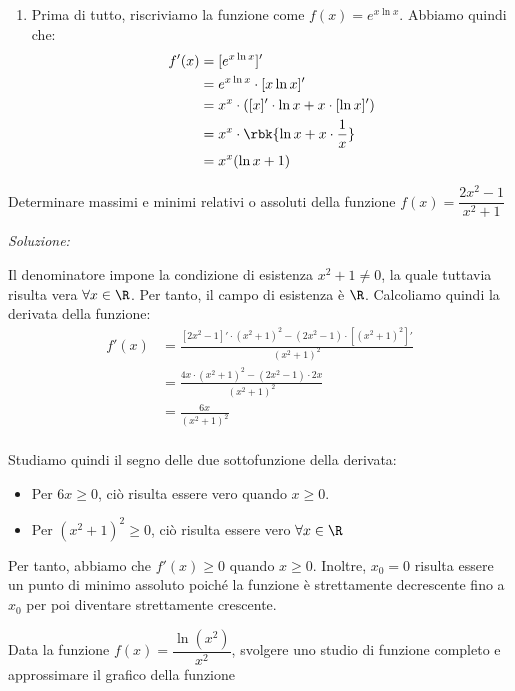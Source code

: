 \documentclass[a4paper, 12pt]{report}
\begin{document}
\begin{enumerate}
        \item Prima di tutto, riscriviamo la funzione come $f(x) = e^{x \ln x}$. Abbiamo quindi che:
        \[\begin{split}
            f'(x) &= [e^{x \ln x}]' \\
            &= e^{x \ln x} \cdot [x \ln x]'\\
            &= x^x \cdot ([x]' \cdot \ln x + x \cdot [\ln x]')\\
            &= x^x \cdot \rbk{\ln x + x \cdot \frac{1}{x}}\\
            &= x^x (\ln x + 1)\\
        \end{split}\]
    \end{enumerate}

    \begin{framedprob}{}
        Determinare massimi e minimi relativi o assoluti della funzione $f(x) = \dfrac{2x^2-1}{x^2+1}$
    \end{framedprob}

    \textit{Soluzione:}

    Il denominatore impone la condizione di esistenza $x^2 + 1 \neq 0$, la quale tuttavia risulta vera $\forall x \in \R$. Per tanto, il campo di esistenza è $\R$. Calcoliamo quindi la derivata della funzione:
    \[\begin{split}
        f'(x) &= \frac{[2x^2-1]' \cdot (x^2+1)^2-(2x^2-1) \cdot [(x^2+1)^2]'}{(x^2+1)^2} \\
        &= \frac{4x \cdot (x^2+1)^2-(2x^2-1) \cdot 2x}{(x^2+1)^2} \\
        &= \frac{6x}{(x^2+1)^2} \\
    \end{split}\]

    Studiamo quindi il segno delle due sottofunzione della derivata:
    \begin{itemize}
        \item Per $6x \geq 0$, ciò risulta essere vero quando $x \geq 0$.
        \item Per $(x^2+1)^2 \geq 0$, ciò risulta essere vero $\forall x \in \R$
    \end{itemize}

    Per tanto, abbiamo che $f'(x) \geq 0$ quando $x \geq 0$. Inoltre, $x_0 = 0$ risulta essere un punto di minimo assoluto poiché la funzione è strettamente decrescente fino a $x_0$ per poi diventare strettamente crescente.


    \begin{framedprob}{}
        Data la funzione $f(x) = \dfrac{\ln(x^2)}{x^2}$, svolgere uno studio di funzione completo e approssimare il grafico della funzione
    \end{framedprob}
\end{document}
